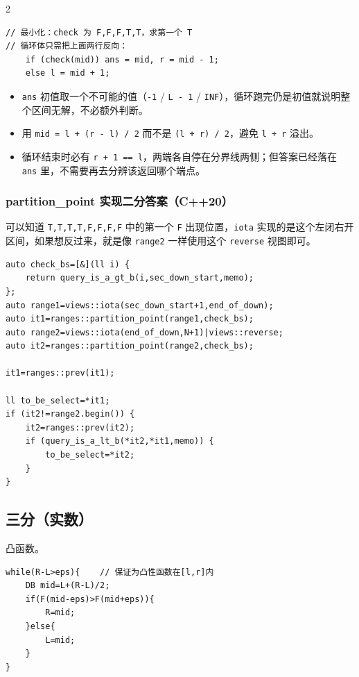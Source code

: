 \begin{multicols*}{2}
\begin{verbatim}
// 最小化：check 为 F,F,F,T,T，求第一个 T
// 循环体只需把上面两行反向：
    if (check(mid)) ans = mid, r = mid - 1;
    else l = mid + 1;
		\end{verbatim}

		\begin{itemize}
			\item \texttt{ans} 初值取一个不可能的值（\texttt{-1} / \texttt{L - 1} / \texttt{INF}），循环跑完仍是初值就说明整个区间无解，不必额外判断。
			\item 用 \texttt{mid = l + (r - l) / 2} 而不是 \texttt{(l + r) / 2}，避免 \texttt{l + r} 溢出。
			\item 循环结束时必有 \texttt{r + 1 == l}，两端各自停在分界线两侧；但答案已经落在 \texttt{ans} 里，不需要再去分辨该返回哪个端点。
		\end{itemize}

		\subsubsection{partition\_point 实现二分答案（C++20）}

		可以知道 \texttt{T,T,T,T,F,F,F,F} 中的第一个 \texttt{F} 出现位置，\texttt{iota} 实现的是这个左闭右开区间，如果想反过来，就是像 \texttt{range2} 一样使用这个 \texttt{reverse} 视图即可。

		\begin{verbatim}
auto check_bs=[&](ll i) {
    return query_is_a_gt_b(i,sec_down_start,memo);
};
auto range1=views::iota(sec_down_start+1,end_of_down);
auto it1=ranges::partition_point(range1,check_bs);
auto range2=views::iota(end_of_down,N+1)|views::reverse;
auto it2=ranges::partition_point(range2,check_bs);

it1=ranges::prev(it1);

ll to_be_select=*it1;
if (it2!=range2.begin()) {
    it2=ranges::prev(it2);
    if (query_is_a_lt_b(*it2,*it1,memo)) {
        to_be_select=*it2;
    }
}
		\end{verbatim}

		\subsection{三分（实数）}

		凸函数。

		\begin{verbatim}
while(R-L>eps){    // 保证为凸性函数在[l,r]内
    DB mid=L+(R-L)/2;
    if(F(mid-eps)>F(mid+eps)){
        R=mid;
    }else{
        L=mid;
    }
}
		\end{verbatim}


\end{multicols*}
